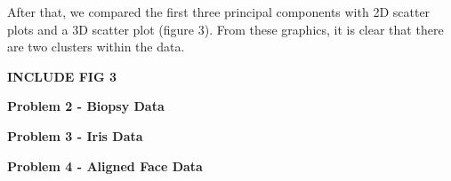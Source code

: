 \documentclass{article}
\begin{document}
After that, we compared the first three principal components with 2D scatter plots and a 3D scatter plot (figure 3).
From these graphics, it is clear that there are two clusters within the data.

\textbf{INCLUDE FIG 3}
 
\bigskip
{\Large {\bf Problem 2 - Biopsy Data}}
\bigskip


\bigskip
{\Large {\bf Problem 3 - Iris Data}}
\bigskip


\bigskip
{\Large {\bf Problem 4 - Aligned Face Data}}
\bigskip
\end{document}
